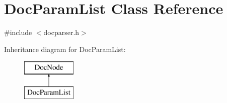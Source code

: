 \hypertarget{class_doc_param_list}{}\section{Doc\+Param\+List Class Reference}
\label{class_doc_param_list}


{\ttfamily \#include $<$docparser.\+h$>$}

Inheritance diagram for Doc\+Param\+List\+:\begin{figure}[H]
\begin{center}
\leavevmode
\includegraphics[height=2.000000cm]{class_doc_param_list}
\end{center}
\end{figure}
